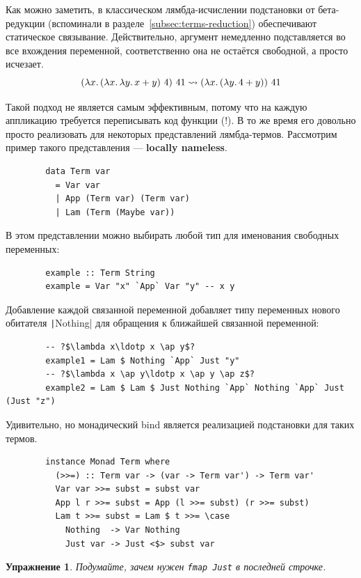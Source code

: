 \documentclass[12pt]{article}
\newcommand{\vocab}[1]{\textbf{#1}} %
\newcommand{\ap}{~}
\newtheorem{task}{Упражнение}
\begin{document}
    Как можно заметить, в классическом лямбда-исчислении подстановки от бета-редукции (вспоминали в разделе~\ref{subsec:terms-reduction}) обеспечивают статическое связывание.
    Действительно, аргумент немедленно подставляется во все вхождения переменной, соответственно она не остаётся свободной, а просто исчезает.
    \[
        (\lambda x\ldotp (\lambda x\ldotp \lambda y\ldotp x + y) \ap 4) \ap 41 \rightsquigarrow (\lambda x\ldotp (\lambda y\ldotp 4 + y)) \ap 41
    \]

    Такой подход не является самым эффективным, потому что на каждую аппликацию требуется переписывать код функции (!).
    В то же время его довольно просто реализовать для некоторых представлений лямбда-термов.
    Рассмотрим пример такого представления --- \vocab{locally nameless}.

    \begin{verbatim}
        data Term var
          = Var var
          | App (Term var) (Term var)
          | Lam (Term (Maybe var))
    \end{verbatim}

    В этом представлении можно выбирать любой тип для именования свободных переменных:
    \begin{verbatim}
        example :: Term String
        example = Var "x" `App` Var "y" -- x y
    \end{verbatim}
    Добавление каждой связанной переменной добавляет типу переменных нового обитателя \texttt|Nothing| для обращения к ближайшей связанной переменной:
    \begin{verbatim}
        -- ?$\lambda x\ldotp x \ap y$?
        example1 = Lam $ Nothing `App` Just "y"
        -- ?$\lambda x \ap y\ldotp x \ap y \ap z$?
        example2 = Lam $ Lam $ Just Nothing `App` Nothing `App` Just (Just "z")
    \end{verbatim}

    Удивительно, но монадический bind является реализацией подстановки для таких термов.

    \begin{verbatim}
        instance Monad Term where
          (>>=) :: Term var -> (var -> Term var') -> Term var'
          Var var >>= subst = subst var
          App l r >>= subst = App (l >>= subst) (r >>= subst)
          Lam t >>= subst = Lam $ t >>= \case
            Nothing  -> Var Nothing
            Just var -> Just <$> subst var
    \end{verbatim}

    \begin{task}
        Подумайте, зачем нужен \texttt{fmap Just} в последней строчке.
    \end{task}
\end{document}
